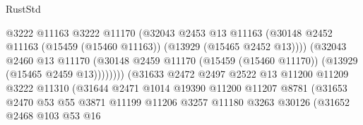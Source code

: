 \begin{lexlean}{RustStd}
\begin{coremodule}
                                          @3222
                                          @11163
                                          @3222
                                          @11170
                                          (@32043
                                            @2453
                                            @13
                                            @11163
                                            (@30148
                                              @2452
                                              @11163
                                              (@15459 (@15460 @11163))
                                              (@13929 (@15465 @2452 @13))))
                                          (@32043
                                            @2460
                                            @13
                                            @11170
                                            (@30148
                                              @2459
                                              @11170
                                              (@15459 (@15460 @11170))
                                              (@13929 (@15465 @2459 @13))))))))
                                  (@31633
                                    @2472
                                    @2497
                                    @2522
                                    @13
                                    @11200
                                    @11209
                                    @3222
                                    @11310
                                    (@31644
                                      @2471
                                      @1014
                                      @19390
                                      @11200
                                      @11207
                                      @8781
                                      (@31653
                                        @2470
                                        @53
                                        @55
                                        @3871
                                        @11199
                                        @11206
                                        @3257
                                        @11180
                                        @3263
                                        @30126
                                        (@31652
                                          @2468
                                          @103
                                          @53
                                          @16

\end{coremodule}
\end{lexlean}
